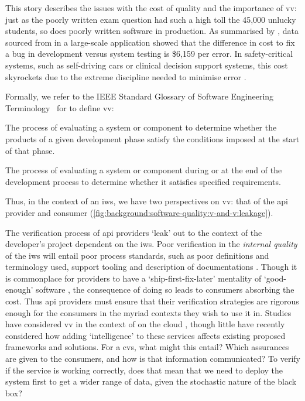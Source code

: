This story describes the issues with the cost of quality \citep{Boehm:2005vj} and the importance of \gls{vv}: just as the poorly written exam question had such a high toll the 45,000 unlucky students, so does poorly written software in production. As summarised by \citet{Pressman:2005vf}, data sourced from \citet{Cigital:2003tl} in a large-scale application showed that the difference in cost to fix a bug in development versus system testing is \$6,159 per error. In safety-critical systems, such as self-driving cars or clinical decision support systems, this cost skyrockets due to the extreme discipline needed to minimise error \citep{Tassey:2002vu}.

Formally, we refer to the IEEE Standard Glossary of Software Engineering Terminology~\citep{IEEE:1990wp} for to define \gls{vv}:

\begin{samepage}
\begin{description}[font=\itshape,style=multiline,leftmargin=3cm]
  \item[verification] The process of evaluating a system or component to determine whether the products of a given development phase satisfy the conditions imposed at the start of that phase.
  \item[validation] The process of evaluating a system or component during or at the end of the development process to determine whether it satisfies specified requirements. 
\end{description} 
\end{samepage}

\noindent
Thus, in the context of an \gls{iws}, we have two perspectives on \gls{vv}: that of the \gls{api} provider and consumer (\cref{fig:background:software-quality:v-and-v:leakage}).

The verification process of \gls{api} providers `leak' out to the context of the developer's project dependent on the \gls{iws}. Poor verification in the \textit{internal quality} of the \gls{iws} will entail poor process standards, such as poor definitions and terminology used, support tooling and description of documentations \citep{Sommerville:2011uc}. Though it is commonplace for providers to have a `ship-first-fix-later' mentality of `good-enough' software \citep{Venners:2003vw}, the consequence of doing so leads to consumers absorbing the cost. Thus \gls{api} providers must ensure that their verification strategies are rigorous enough for the consumers in the myriad contexts they wish to use it in. Studies have considered \gls{vv} in the context of  on the cloud \citep{Nakajima:2002ut,Narayanan:2002ti,Foster:2003ur,Heckel:2005uk,Canfora:2006vk,Canfora:2005vd,Yi:2004ve,Bai:2007tl}, though little have recently considered how adding `intelligence' to these services affects existing proposed frameworks and solutions. For a \gls{cvs}, what might this entail? Which assurances are given to the consumers, and how is that information communicated? To verify if the service is working correctly, does that mean that we need to deploy the system first to get a wider range of data, given the stochastic nature of the black box?

